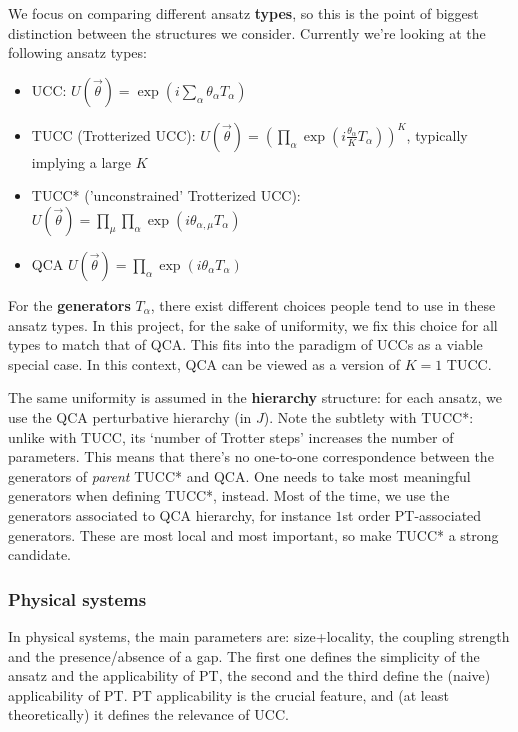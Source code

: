 \documentclass[10pt, a4paper]{article}
\begin{document}
We focus on comparing different ansatz \textbf{types}, so this is the point of biggest distinction between the structures we consider. Currently we're looking at the following ansatz types:

\begin{itemize}
\item UCC: $U(\vec{\theta})=\exp(i\sum_{\alpha}\theta_{\alpha}T_\alpha)$
\item TUCC (Trotterized UCC): $U(\vec{\theta})=(\prod_{\alpha}\exp(i\frac{\theta_{\alpha}}{K}T_\alpha))^K$, typically implying a large $K$
\item TUCC* ('unconstrained' Trotterized UCC): $U(\vec{\theta})=\prod_{\mu}\prod_{\alpha}\exp(i\theta_{\alpha,\mu}T_\alpha)$
\item QCA $U(\vec{\theta})=\prod_{\alpha}\exp(i\theta_{\alpha}T_\alpha)$
\end{itemize}

For the \textbf{generators} $T_{\alpha}$, there exist different choices people tend to use in these ansatz types. In this project, for the sake of uniformity, we fix this choice for all types to match that of QCA. This fits into the paradigm of UCCs as a viable special case. In this context, QCA can be viewed as a version of $K=1$ TUCC.

The same uniformity is assumed in the \textbf{hierarchy} structure: for each ansatz, we use the QCA perturbative hierarchy (in $J$). Note the subtlety with TUCC*: unlike with TUCC, its `number of Trotter steps' increases the number of parameters. This means that there's no one-to-one correspondence between the generators of \textit{parent} TUCC* and QCA. One needs to take most meaningful generators when defining TUCC*, instead. Most of the time, we use the generators associated to QCA hierarchy, for instance $1$st order PT-associated generators. These are most local and most important, so make TUCC* a strong candidate.

\subsubsection*{Physical systems}

In physical systems, the main parameters are: size+locality, the coupling strength and the presence/absence of a gap. The first one defines the simplicity of the ansatz and the applicability of PT, the second and the third define the (naive) applicability of PT. PT applicability is the crucial feature, and (at least theoretically) it defines the relevance of UCC.
\end{document}
